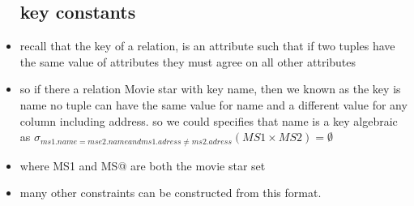 \documentclass{article}
\begin{document}
\begin{itemize}
\subsection{key constants}
\item recall that the key of a relation, is an attribute such that if two tuples have the same value of attributes they must agree on all other attributes 
\item so if there a relation Movie star with key name, then we known as the key is name no tuple can have the same value for name and a different value for any column including address. so we could specifies that name is a key algebraic as $\sigma_{ms1.name=mse2.name and ms1.adress\neq ms2.adress}(MS1\times MS2)=\emptyset$  
\item where MS1 and MS@ are both the movie star set 
\item many other constraints can be constructed from this format. 
\end{itemize}
\end{document}
